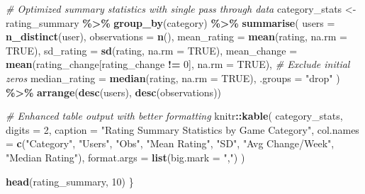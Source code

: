\documentclass[
]{article}
\newenvironment{Shaded}{\begin{snugshade}}{\end{snugshade}}
\newcommand{\AttributeTok}[1]{\textcolor[rgb]{0.13,0.29,0.53}{#1}}
\newcommand{\CommentTok}[1]{\textcolor[rgb]{0.56,0.35,0.01}{\textit{#1}}}
\newcommand{\ConstantTok}[1]{\textcolor[rgb]{0.56,0.35,0.01}{#1}}
\newcommand{\DecValTok}[1]{\textcolor[rgb]{0.00,0.00,0.81}{#1}}
\newcommand{\FunctionTok}[1]{\textcolor[rgb]{0.13,0.29,0.53}{\textbf{#1}}}
\newcommand{\NormalTok}[1]{#1}
\newcommand{\OtherTok}[1]{\textcolor[rgb]{0.56,0.35,0.01}{#1}}
\newcommand{\SpecialCharTok}[1]{\textcolor[rgb]{0.81,0.36,0.00}{\textbf{#1}}}
\newcommand{\StringTok}[1]{\textcolor[rgb]{0.31,0.60,0.02}{#1}}
\begin{document}
\begin{Shaded}
\begin{Highlighting}[]
    \CommentTok{\# Optimized summary statistics with single pass through data}
\NormalTok{    category\_stats }\OtherTok{\textless{}{-}}\NormalTok{ rating\_summary }\SpecialCharTok{\%\textgreater{}\%}
        \FunctionTok{group\_by}\NormalTok{(category) }\SpecialCharTok{\%\textgreater{}\%}
        \FunctionTok{summarise}\NormalTok{(}
            \AttributeTok{users =} \FunctionTok{n\_distinct}\NormalTok{(user),}
            \AttributeTok{observations =} \FunctionTok{n}\NormalTok{(),}
            \AttributeTok{mean\_rating =} \FunctionTok{mean}\NormalTok{(rating, }\AttributeTok{na.rm =} \ConstantTok{TRUE}\NormalTok{),}
            \AttributeTok{sd\_rating =} \FunctionTok{sd}\NormalTok{(rating, }\AttributeTok{na.rm =} \ConstantTok{TRUE}\NormalTok{),}
            \AttributeTok{mean\_change =} \FunctionTok{mean}\NormalTok{(rating\_change[rating\_change }\SpecialCharTok{!=} \DecValTok{0}\NormalTok{], }\AttributeTok{na.rm =} \ConstantTok{TRUE}\NormalTok{), }\CommentTok{\# Exclude initial zeros}
            \AttributeTok{median\_rating =} \FunctionTok{median}\NormalTok{(rating, }\AttributeTok{na.rm =} \ConstantTok{TRUE}\NormalTok{),}
            \AttributeTok{.groups =} \StringTok{"drop"}
\NormalTok{        ) }\SpecialCharTok{\%\textgreater{}\%}
        \FunctionTok{arrange}\NormalTok{(}\FunctionTok{desc}\NormalTok{(users), }\FunctionTok{desc}\NormalTok{(observations))}

    \CommentTok{\# Enhanced table output with better formatting}
\NormalTok{    knitr}\SpecialCharTok{::}\FunctionTok{kable}\NormalTok{(}
\NormalTok{        category\_stats,}
        \AttributeTok{digits =} \DecValTok{2}\NormalTok{,}
        \AttributeTok{caption =} \StringTok{"Rating Summary Statistics by Game Category"}\NormalTok{,}
        \AttributeTok{col.names =} \FunctionTok{c}\NormalTok{(}\StringTok{"Category"}\NormalTok{, }\StringTok{"Users"}\NormalTok{, }\StringTok{"Obs"}\NormalTok{, }\StringTok{"Mean Rating"}\NormalTok{, }\StringTok{"SD"}\NormalTok{, }\StringTok{"Avg Change/Week"}\NormalTok{, }\StringTok{"Median Rating"}\NormalTok{),}
        \AttributeTok{format.args =} \FunctionTok{list}\NormalTok{(}\AttributeTok{big.mark =} \StringTok{","}\NormalTok{)}
\NormalTok{    )}

    \FunctionTok{head}\NormalTok{(rating\_summary, }\DecValTok{10}\NormalTok{)}
\NormalTok{\}}
\end{Highlighting}
\end{Shaded}
\end{document}
